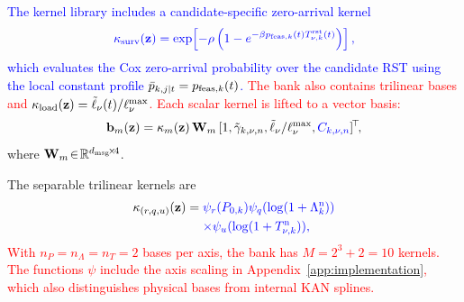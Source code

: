 \documentclass[10pt,letterpaper,journal]{IEEEtran}
\newcommand{\revnew}[1]{\textcolor{red}{#1}}
\begin{document}
\textcolor{blue}{The kernel library includes a candidate-specific zero-arrival kernel}
\begin{equation}
\textcolor{blue}{
\kappa_{\rm surv}(\mathbf z)
=\exp\!\left[-\rho\left(1-e^{-\beta p_{{\rm feas},k}(t)T_{\nu,k}^{\rm rst}(t)}\right)\right],
}
\label{eq:kappa_surv_main}
\end{equation}
\textcolor{blue}{which evaluates the Cox zero-arrival probability over the candidate RST using the local constant profile $\bar p_{k,j|t}=p_{{\rm feas},k}(t)$.}
\revnew{The bank also contains trilinear bases and $\kappa_{\rm load}(\mathbf z)=\tilde\ell_\nu(t)/\ell_\nu^{\max}$. Each scalar kernel is lifted to a vector basis:}
\begin{equation}
\mathbf{b}_m(\mathbf{z})=\kappa_m(\mathbf{z})\,\mathbf{W}_m\,[1,\tilde{\gamma}_{k,\nu,n},\tilde{\ell}_\nu/\ell_\nu^{\max},\textcolor{blue}{{C}_{k,\nu,n}}]^{\!\top}\!,
\label{eq:b_m_main}
\end{equation}
where $\mathbf{W}_m\!\in\!\mathbb{R}^{d_{\rm msg}\!\times\!4}$.

The separable trilinear kernels are
\begin{equation}
\begin{aligned}
\kappa_{(r,q,u)}(\mathbf z)
={}&\textcolor{blue}{\psi_r(P_{0,k})\psi_q(\log(1+\Lambda_k^{\mathrm n}))}\\
&\textcolor{blue}{\times\psi_u(\log(1+T_{\nu,k}^{\mathrm n})),}
\end{aligned}  
\end{equation}
\revnew{With $n_P=n_\Lambda=n_T=2$ bases per axis, the bank has $M=2^3+2=10$ kernels. The functions $\psi$ include the axis scaling in Appendix~\ref{app:implementation}, which also distinguishes physical bases from internal KAN splines.}
\end{document}
